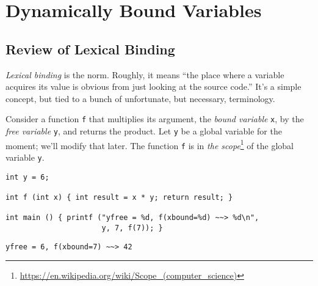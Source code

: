 \documentclass[10pt,oneside,x11names]{article}
\begin{document}
\section{Dynamically Bound Variables}
\label{sec:org36a4936}

\subsection{Review of Lexical Binding}
\label{sec:org131bb36}

\emph{Lexical binding} is the norm. Roughly, it means ``the place where
a variable acquires its value is obvious from just looking at the
source code.'' It's a simple concept, but tied to a bunch of
unfortunate, but necessary, terminology.

Consider a function \texttt{f} that multiplies its argument, the \emph{bound
variable} \texttt{x}, by the \emph{free variable} \texttt{y}, and returns the
product. Let \texttt{y} be a global variable for the moment; we'll modify
that later. The function \texttt{f} is in \emph{the scope}\footnote{\url{https://en.wikipedia.org/wiki/Scope\_(computer\_science)}}
of the global variable \texttt{y}.

\vskip 0.25cm
\begin{verbatim}
int y = 6;

int f (int x) { int result = x * y; return result; }

int main () { printf ("yfree = %d, f(xbound=%d) ~~> %d\n",
                      y, 7, f(7)); }
\end{verbatim}

\begin{verbatim}
yfree = 6, f(xbound=7) ~~> 42
\end{verbatim}
\end{document}
